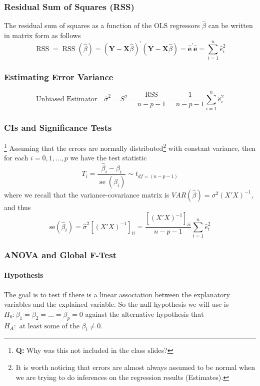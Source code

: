 \documentclass[10pt]{article}
\begin{document}
\subsubsection{Residual Sum of Squares (RSS)}
The residual sum of squares as a function of the OLS regressors $\hat{\beta}$ can be written in matrix form as follows
\begin{equation*}
    \operatorname{RSS}=\operatorname{RSS}(\hat{\beta})=(\mathbf{Y}-\mathbf{X} \hat{\beta})^{\prime}(\mathbf{Y}-\mathbf{X} \hat{\beta})=\hat{\mathbf{e}}^{\prime } \hat{\mathbf{e}}=\sum_{i=1}^{n} \hat{e}_{i}^{2}
\end{equation*}

\subsubsection{Estimating Error Variance}
\begin{equation*}
    \text{Unbiased Estimator}\quad \hat{\sigma}^2 = S^2 = \frac{\mathrm{RSS}}{n-p-1}=\frac{1}{n-p-1} \sum_{i=1}^{n} \hat{e}_{i}^{2}
\end{equation*}


\subsubsection{CIs and Significance Tests}\footnote{\textbf{Q:} Why was this not included in the class slides?}
Assuming that the errors are normally distributed\footnote{It is worth noticing that errors are almost always assumed to be normal when we are trying to do inferences on the regression results (Estimates).} with constant variance, then for each $i = 0,1,...,p$ we have the test statistic
\begin{equation*}
    T_{i}=\frac{\hat{\beta}_{i}-\beta_{i}}{\operatorname{se}(\hat{\beta_i})} \sim t_{df = (n-p-1)}
\end{equation*}
where we recall that the variance-covariance matrix is $VAR(\hat{\beta}) = \sigma^2 (X'X)^{-1}$, and thus
\begin{equation*}
    \mathrm{se}(\hat{\beta}_i) = \hat{\sigma}^2 \left[(X'X)^{-1}\right]_{ii} =  \frac{\left[(X'X)^{-1}\right]_{ii}}{n-p-1} \sum_{i=1}^{n} \hat{e}_{i}^{2}
\end{equation*}


\subsubsection{ANOVA and Global F-Test}
\paragraph{Hypothesis} The goal is to test if there is a linear association between the explanatory variables and the explained variable. So the null hypothesis we will use is $H_{0}: \beta_{1}=\beta_{2}=\ldots=\beta_{p}=0$ against the alternative hypothesis that $H_{A}: \text { at least some of the } \beta_{i} \neq 0$. 
\end{document}
